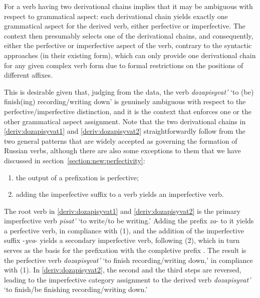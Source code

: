For a verb having two derivational chains implies that it may be ambiguous with respect to grammatical aspect: each derivational chain yields exactly one grammatical aspect for the derived verb, either perfective or imperfective. The context then presumably selects one of the derivational chains, and consequently, either the perfective or imperfective aspect of the verb, contrary to the syntactic approaches (in their existing form), which can only provide one derivational chain for any given complex verb form due to formal restrictions on the positions of different affixes.

This is desirable given that, judging from the data, the verb \textit{dozapisyvat'} `to (be) finish(ing) recording/writing down' is genuinely ambiguous with respect to the perfective/imperfective distinction, and it is the context that enforces one or the other grammatical aspect assignment. Note that the two derivational chains in \ref{deriv:dozapisyvat1} and \ref{deriv:dozapisyvat2} straightforwardly follow from the two general patterns that are widely accepted as governing the formation of Russian verbs, although there are also some exceptions to them that we have discussed in section~\ref{section:new:perfectivity}:

\begin{enumerate}
\item the output of a prefixation is perfective;   
\item adding the imperfective suffix to a verb yields an imperfective verb. 
\end{enumerate}

The root verb in \ref{deriv:dozapisyvat1} and \ref{deriv:dozapisyvat2} is the primary imperfective verb \textit{pisat'} `to write/to be writing.' Adding the prefix \textit{za}- to it yields a perfective verb, in compliance with (1), and the addition of the imperfective suffix -\textit{yva}- yields a secondary imperfective verb, following (2), which in turn serves as the basis for the prefixation with the completive prefix . The result is the perfective verb \textit{dozapisyvat'} `to finish recording/writing down,' in compliance with (1).  In \ref{deriv:dozapisyvat2}, the second and the third steps are reversed, leading to the imperfective category assignment to the derived verb \textit{dozapisyvat'} `to finish/be finishing recording/writing down.'

